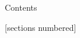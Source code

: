 \documentclass[
presentation.tex
]{subfiles}
\begin{document}
	
	\begin{frame}{Contents}
		
		[sections numbered]
		\tableofcontents[hideallsubsections]
		
	\end{frame}
\end{document}
